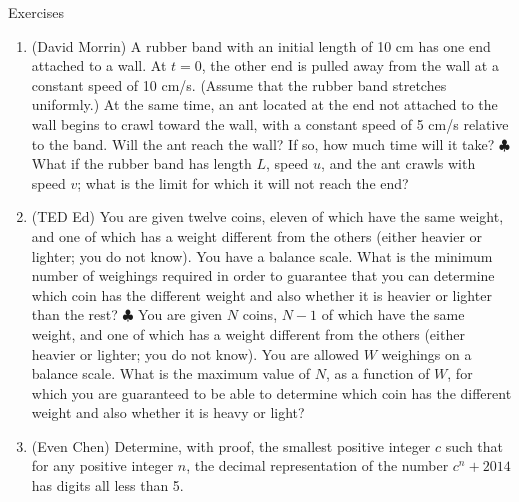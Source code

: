 \begin{xcb}{Exercises}
\begin{enumerate}
\item (David Morrin) A rubber band with an initial length of 10 cm has one end attached to a wall. At $t = 0$, the other end is pulled away from the wall at a constant speed of 10 cm/s. (Assume that the rubber band stretches uniformly.) At the same time, an ant located at the end not attached to the wall begins to crawl toward the wall, with a constant speed of 5 cm/s relative to the band. Will the ant reach the wall? If so, how much time will it take? $\clubsuit$ What if the rubber band has length $L$, speed $u$, and the ant crawls with speed $v$; what is the limit for which it will not reach the end?
\begin{hint}
\end{hint}
\item (TED Ed)  You are given twelve coins, eleven of which have the same weight, and one of which has a weight different from the others (either heavier or lighter; you do not know). You have a balance scale. What is the minimum number of weighings required in order to guarantee that you can determine which coin has the different weight and also whether it is heavier or lighter than the rest? $\clubsuit$  You are given $N$ coins, $N-1$ of which have the same weight, and one of which has a weight different from the others (either heavier or lighter; you do not know). You are allowed $W$ weighings on a balance scale. What is the maximum value of $N$, as a function of $W$, for which you are guaranteed to be able to determine which coin has the different weight and also whether it is heavy or light?
\begin{hint}
\end{hint}
\item (Even Chen)  Determine, with proof, the smallest positive integer $c$ such that for any positive integer $n$, the decimal representation of the number $c^n+2014$ has digits all less than 5.
\begin{hint}

\end{hint}
\end{enumerate}
\end{xcb}
